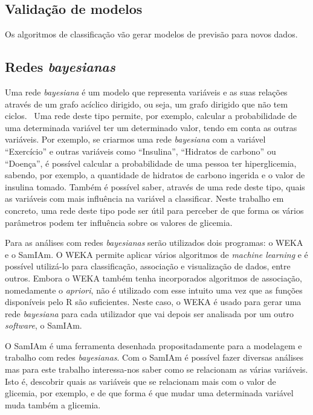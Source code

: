 \subsection{Validação de modelos}

Os algoritmos de classificação vão gerar modelos de previsão para novos dados. 

\subsection{Redes \textit{bayesianas}}
Uma rede \textit{bayesiana} é um modelo que representa variáveis e as suas relações através de um grafo acíclico dirigido, ou seja, um grafo dirigido que não tem ciclos.~\cite{bayes} Uma rede deste tipo permite, por exemplo, calcular a probabilidade de uma determinada variável ter um determinado valor, tendo em conta as outras variáveis. Por exemplo, se criarmos uma rede \textit{bayesiana} com a variável ``Exercício'' e outras variáveis como ``Insulina'', ``Hidratos de carbono'' ou ``Doença'', é possível calcular a probabilidade de uma pessoa ter hiperglicemia, sabendo, por exemplo, a quantidade de hidratos de carbono ingerida e o valor de insulina tomado. Também é possível saber, através de uma rede deste tipo, quais as variáveis com mais influência na variável a classificar. Neste trabalho em concreto, uma rede deste tipo pode ser útil para perceber de que forma os vários parâmetros podem ter influência sobre os valores de glicemia.

Para as análises com redes \textit{bayesianas} serão utilizados dois programas: o \ac{WEKA} e o \ac{SamIAm}.
O \ac{WEKA} permite aplicar vários algoritmos de \textit{machine learning} e é possível utilizá-lo para classificação, associação e visualização de dados, entre outros. Embora o \ac{WEKA} também tenha incorporados algoritmos de associação, nomedamente o \textit{apriori}, não é utilizado com esse intuito uma vez que as funções disponíveis pelo R são suficientes. Neste caso, o \ac{WEKA} é usado para gerar uma rede \textit{bayesiana} para cada utilizador que vai depois ser analisada por um outro \textit{software}, o \ac{SamIAm}.

O \ac{SamIAm} é uma ferramenta desenhada propositadamente para a modelagem e trabalho com redes \textit{bayesianas}. Com o \ac{SamIAm} é possível fazer diversas análises mas para este trabalho interessa-nos saber como se relacionam as várias variáveis. Isto é, descobrir quais as variáveis que se relacionam mais com o valor de glicemia, por exemplo, e de que forma é que mudar uma determinada variável muda também a glicemia.

